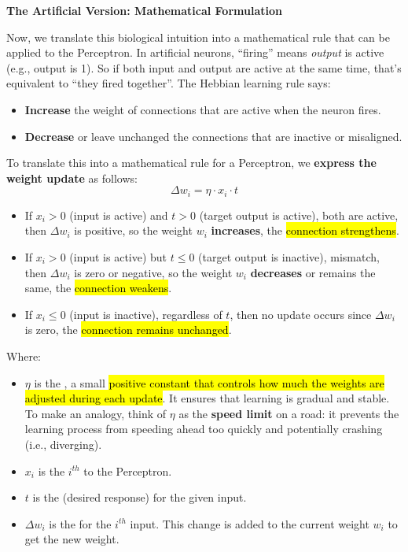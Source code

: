 \highspace
\begin{flushleft}
    \textcolor{Green3}{ \textbf{The Artificial Version: Mathematical Formulation}}
\end{flushleft}
Now, we translate this biological intuition into a mathematical rule that can be applied to the Perceptron. In artificial neurons, ``firing'' means \emph{output} is active (e.g., output is 1). So if both input and output are active at the same time, that's equivalent to ``they fired together''. The Hebbian learning rule says:
\begin{itemize}
    \item \textbf{Increase} the weight of connections that are active when the neuron fires.
    \item \textbf{Decrease} or leave unchanged the connections that are inactive or misaligned.
\end{itemize}
To translate this into a mathematical rule for a Perceptron, we \textbf{express the weight update} as follows:
\begin{equation}
    \Delta w_i = \eta \cdot x_i \cdot t
\end{equation}
\begin{itemize}
    \item If $x_{i} > 0$ (input is active) and $t > 0$ (target output is active), both are active, then $\Delta w_i$ is positive, so the weight $w_i$ \textbf{increases}, the \hl{connection strengthens}.
    \item If $x_{i} > 0$ (input is active) but $t \leq 0$ (target output is inactive), mismatch, then $\Delta w_i$ is zero or negative, so the weight $w_i$ \textbf{decreases} or remains the same, the \hl{connection weakens}.
    \item If $x_{i} \leq 0$ (input is inactive), regardless of $t$, then no update occurs since $\Delta w_i$ is zero, the \hl{connection remains unchanged}.
\end{itemize}
Where:
\begin{itemize}
    \item $\eta$ is the , a small \hl{positive constant that controls how much the weights are adjusted during each update}. It ensures that learning is gradual and stable. To make an analogy, think of $\eta$ as the \textbf{speed limit} on a road: it prevents the learning process from speeding ahead too quickly and potentially crashing (i.e., diverging).
    \item $x_{i}$ is the $i^{th}$  to the Perceptron.
    \item $t$ is the  (desired response) for the given input.
    \item $\Delta w_i$ is the  for the $i^{th}$ input. This change is added to the current weight $w_i$ to get the new weight.
\end{itemize}
